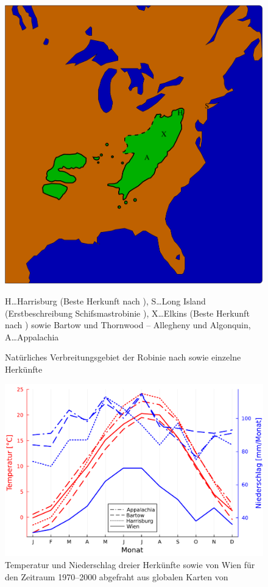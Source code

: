 \documentclass[twocolumn]{scrartcl}
\begin{document}
\begin{figure}[htbp]
  \centering
  \includegraphics[width=.9\linewidth]{./bild/map4}
  \caption{Natürliches Verbreitungsgebiet der Robinie nach \cite{little1971treeAtlas} sowie einzelne Herkünfte}
  \footnotesize{H\dots Harrisburg (Beste Herkunft nach \cite{cobbett1825woodlands}),
    S\dots Long Island (Erstbeschreibung Schifsmastrobinie \cite{raber1936shipmast}),
    X\dots Elkins (Beste Herkunft nach \cite{hopp1941robinie}) sowie Bartow und Thornwood -- Allegheny und Algonquin,
    A\dots Appalachia}
  \label{fig:verbreitungNatuerlich}
\end{figure}

\begin{figure}[htbp]
  \centering
  \includegraphics[width=.9\linewidth]{./bild/wetter}
  \caption{Temperatur und Niederschlag dreier Herkünfte sowie von Wien für den
  Zeitraum 1970--2000 abgefraht aus globalen Karten von \cite{worldclim2017}}
  \label{fig:wetter}
\end{figure}
\end{document}
